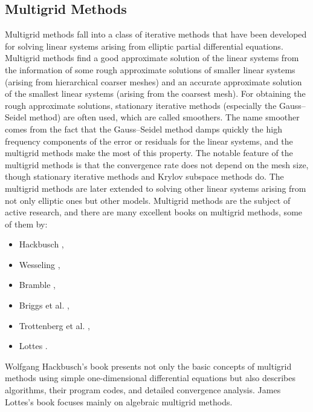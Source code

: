 \subsection{{Multigrid Methods}}\label{sec:multigrid-methods}
{Multigrid methods fall into a class of iterative methods that have been developed for solving linear systems arising from elliptic partial differential equations. Multigrid methods find a good approximate solution of the linear systems from the information of some rough approximate solutions of smaller linear systems (arising from hierarchical coarser meshes) and an accurate approximate solution of the smallest linear systems (arising from the coarsest mesh). For obtaining the rough approximate solutions, stationary iterative methods (especially the Gauss--Seidel method) are often used, which are called smoothers. The name smoother comes from the fact that the Gauss--Seidel method damps quickly the high frequency components of the error or residuals for the linear systems, and the multigrid methods make the most of this property.}
{The notable feature of the multigrid methods is that the convergence rate does not depend on the mesh size, though stationary iterative methods and Krylov subspace methods do. The multigrid methods are later extended to solving other linear systems arising from not only elliptic ones but other models.}
{Multigrid methods are the subject of active research, and there are many excellent books on multigrid methods, some of them by:}
\begin{itemize}
\item Hackbusch ,
\item Wesseling ,
\item Bramble ,
\item Briggs et al. ,
\item Trottenberg et al. ,
\item Lottes .
\end{itemize}
{Wolfgang Hackbusch's book presents not only the basic concepts of multigrid methods using simple one-dimensional differential equations but also describes algorithms, their program codes, and detailed convergence analysis. James Lottes's book focuses mainly on algebraic multigrid methods.}
